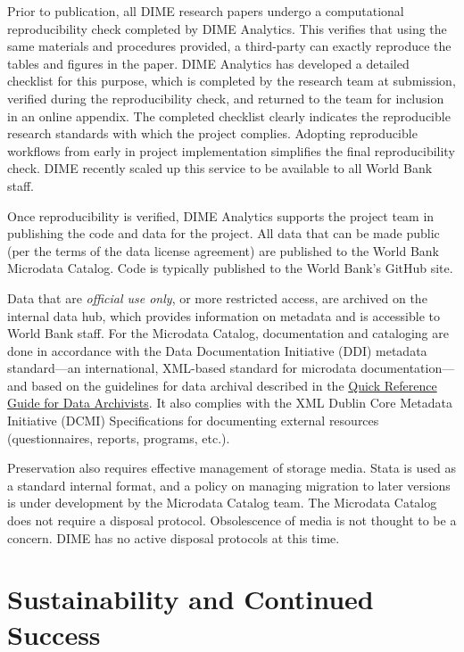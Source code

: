 Prior to publication, all DIME research papers undergo a computational reproducibility check completed by DIME Analytics. This verifies that using the same materials and procedures provided, a third-party can exactly reproduce the tables and figures in the paper. DIME Analytics has developed a detailed checklist for this purpose, which is completed by the research team at submission, verified during the reproducibility check, and returned to the team for inclusion in an online appendix. The completed checklist clearly indicates the reproducible research standards with which the project complies. Adopting reproducible workflows from early in project implementation simplifies the final reproducibility check. DIME recently scaled up this service to be available to all World Bank staff.

Once reproducibility is verified, DIME Analytics supports the project team in publishing the code and data for the project. All data that can be made public (per the terms of the data license agreement) are published to the World Bank Microdata Catalog. Code is typically published to the World Bank's GitHub site. 

Data that are \emph{official use only}, or more restricted access, are archived on the internal data hub, which provides information on metadata and is accessible to World Bank staff. For the Microdata Catalog, documentation and cataloging are done in accordance with the Data Documentation Initiative (DDI) metadata standard---an international, XML-based standard for microdata documentation---and based on the guidelines for data archival described in the \href{https://guide-for-data-archivists.readthedocs.io/en/latest/}{Quick Reference Guide for Data Archivists}. It also complies with the XML Dublin Core Metadata Initiative (DCMI) Specifications for documenting external resources (questionnaires, reports, programs, etc.). 

Preservation also requires effective management of storage media. Stata is used as a standard internal format, and a policy on managing migration to later versions is under development by the Microdata Catalog team. The Microdata Catalog does not require a disposal protocol. Obsolescence of media is not thought to be a concern. DIME has no active disposal protocols at this time.

\hypertarget{sustainability-and-continued-success-6}{%
\section{Sustainability and Continued Success}\label{sustainability-and-continued-success-6}}

